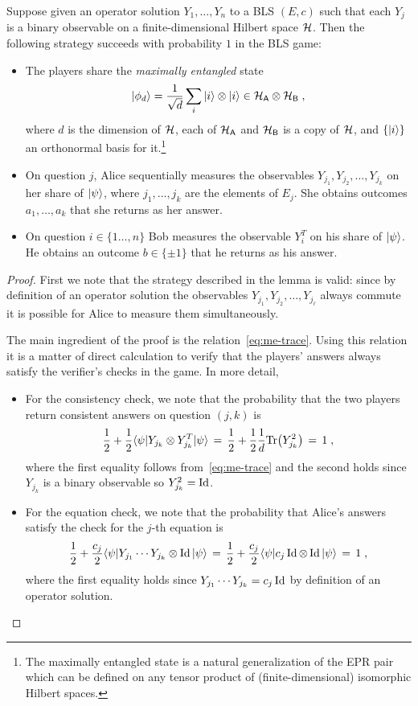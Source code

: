 \begin{lemma}\label{lem:bcs-perfect}
Suppose given an operator solution $Y_1,\ldots,Y_n$ to a BLS $(E,c)$ such that each $Y_j$ is a binary observable on a finite-dimensional Hilbert space $\mathcal{H}$. Then the following strategy succeeds with probability $1$ in the BLS game:
\begin{itemize}
\item The players share the \emph{maximally entangled} state 
\begin{equation}\label{eq:psi-bls}
 |\phi_d\rangle = \frac{1}{\sqrt{d}} \sum_{i} |i\rangle \otimes |i\rangle \in \mathcal{H}_{\textsf{A}} \otimes \mathcal{H}_{\textsf{B}}\;,
\end{equation}
 where $d$ is the dimension of $\mathcal{H}$, each of $\mathcal{H}_{\textsf{A}}$ and $\mathcal{H}_{\textsf{B}}$ is a copy of $\mathcal{H}$, and $\{|i\rangle\}$ an orthonormal basis for it.\footnote{The maximally entangled state is a natural generalization of the EPR pair which can be defined on any tensor product of (finite-dimensional) isomorphic Hilbert spaces.}
\item On question $j$, Alice sequentially measures the observables $Y_{j_1},Y_{j_2},\ldots,Y_{j_k}$ on her share of $|\psi\rangle$, where $j_1,\ldots,j_k$ are the elements of $E_j$. She obtains outcomes $a_1,\ldots,a_k$ that she returns as her answer. 
\item On question $i\in \{1\ldots,n\}$ Bob measures the observable $Y_{i}^T$ on his share of $|\psi\rangle$. He obtains an outcome $b\in\{\pm 1\}$ that he returns as his answer. 
\end{itemize}
\end{lemma}

\begin{proof}
First we note that the strategy described in the lemma is valid: since by definition of an operator solution the observables $Y_{j_1},Y_{j_2},\ldots,Y_{j_\ell}$ always commute it is possible for Alice to measure them simultaneously. 

The main ingredient of the proof is the relation~\eqref{eq:me-trace}.  Using this relation it is a matter of direct calculation to verify that the players' answers always satisfy the verifier's checks in the game. In more detail, 
\begin{itemize}
\item For the consistency check, we note that the probability that the two players return consistent answers on question $(j,k)$ is 
\[ \frac{1}{2}+\frac{1}{2}\langle\psi| Y_{j_k} \otimes Y_{j_k}^T |\psi\rangle \,=\, \frac{1}{2}+\frac{1}{2}\frac{1}{d} \mbox{\rm Tr}\big(Y_{j_k}^2\big) \,=\, 1\;,\]
where the first equality follows from~\eqref{eq:me-trace} and the second holds since $Y_{j_k}$ is a binary observable so $Y_{j_k}^2 = \mathop{\rm Id}\nolimits$. 
\item For the equation check, we note that the probability that Alice's answers satisfy the check for the $j$-th equation is 
\[ \frac{1}{2}+\frac{c_j}{2}\langle\psi|  Y_{j_1}\cdots Y_{j_k}\otimes \mathop{\rm Id}\nolimits |\psi\rangle \,=\,\frac{1}{2}+\frac{c_j}{2} \langle\psi| c_j\mathop{\rm Id}\nolimits\otimes \mathop{\rm Id}\nolimits  |\psi\rangle\,=\,1\;,\]
where the first equality holds since $Y_{j_1}\cdots Y_{j_k} =c_j\mathop{\rm Id}\nolimits$ by definition of an operator solution.
\end{itemize}
\end{proof}


